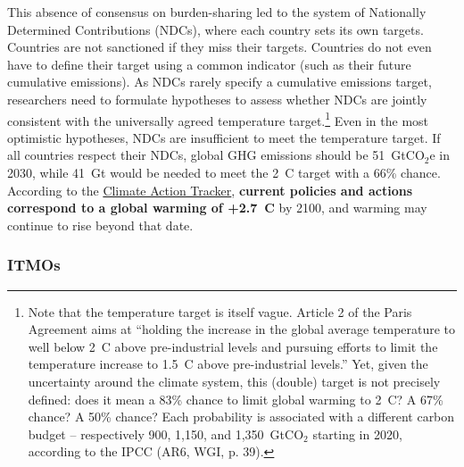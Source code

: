 \documentclass[12pt,english]{article}
\begin{document}
This absence of consensus on burden-sharing led to the system of Nationally Determined Contributions (NDCs), where each country sets its own targets. Countries are not sanctioned if they miss their targets. Countries do not even have to define their target using a common indicator (such as their future cumulative emissions). As NDCs rarely specify a cumulative emissions target, researchers need to formulate hypotheses to assess whether NDCs are jointly consistent with the universally agreed temperature target.\footnote{Note that the temperature target is itself vague. Article 2 of the Paris Agreement aims at ``holding the increase in the global average temperature to well below 2~\textdegree{}C above pre-industrial levels and pursuing efforts to limit the temperature increase to 1.5~\textdegree{}C above pre-industrial levels.'' Yet, given the uncertainty around the climate system, this (double) target is not precisely defined: does it mean a 83\% chance to limit global warming to 2~\textdegree{}C? A 67\% chance? A 50\% chance? Each probability is associated with a different carbon budget -- respectively 900, 1,150, and 1,350~GtCO$_\text{2}$ starting in 2020, according to the IPCC (AR6, WGI, p. 39).} 
Even in the most optimistic hypotheses, NDCs are insufficient to meet the temperature target. If all countries respect their NDCs, global GHG emissions should be 51~GtCO$_\text{2}$e in 2030, while 41~Gt would be needed to meet the 2~\textdegree{}C target with a 66\% chance.\cite{den_elzen_updated_2022} According to the \href{https://climateactiontracker.org/}{Climate Action Tracker}, 
\textbf{current policies and actions correspond to a global warming of +2.7~\textdegree{}C} by 2100, and warming may continue to rise beyond that date.

\subsubsection{ITMOs\label{subsubsec:itmo}} 
\end{document}
